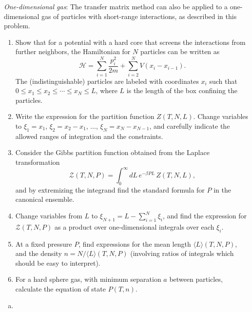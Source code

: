 \begin{problem}
    \textit{One-dimensional gas}: The transfer matrix method can also be applied to a one-dimensional gas of particles with short-range interactions, as described in this problem.

    \begin{enumerate}
        \item[(a)] Show that for a potential with a hard core that screens the interactions from further neighbors, the Hamiltonian for $N$ particles can be written as
        \[
            \mathcal{H} = \sum_{i=1}^N\frac{p_i^2}{2m} + \sum_{i=2}^N V(x_i - x_{i-1}).
        \]
        The (indistinguishable) particles are labeled with coordinates $x_i$ such that $0 \leq x_1 \leq x_2 \leq \cdots \leq x_N \leq L$, where $L$ is the length of the box confining the particles.

        \item[(b)] Write the expression for the partition function $Z(T,N,L)$. Change variables to $\xi_1 = x_1$, $\xi_2 = x_2 - x_1$, $\ldots$, $\xi_N = x_N - x_{N-1}$, and carefully indicate the allowed ranges of integration and the constraints.

        \item[(c)] Consider the Gibbs partition function obtained from the Laplace transformation
        \[
            \mathcal{Z}(T,N,P) = \int_0^\infty dL\,e^{-\beta PL}\,Z(T,N,L),
        \]
        and by extremizing the integrand find the standard formula for $P$ in the canonical ensemble.

        \item[(d)] Change variables from $L$ to $\xi_{N+1} = L - \sum_{i=1}^N\xi_i$, and find the expression for $\mathcal{Z}(T,N,P)$ as a product over one-dimensional integrals over each $\xi_i$.

        \item[(e)] At a fixed pressure $P$, find expressions for the mean length $\langle L\rangle(T,N,P)$, and the density $n = N/\langle L\rangle(T,N,P)$ (involving ratios of integrals which should be easy to interpret).

        \item[(f)] For a hard sphere gas, with minimum separation $a$ between particles, calculate the equation of state $P(T,n)$.
    \end{enumerate}
\end{problem}

\begin{solution}
    \begin{enumerate}[(a)]
        \item
    \end{enumerate}
\end{solution}

